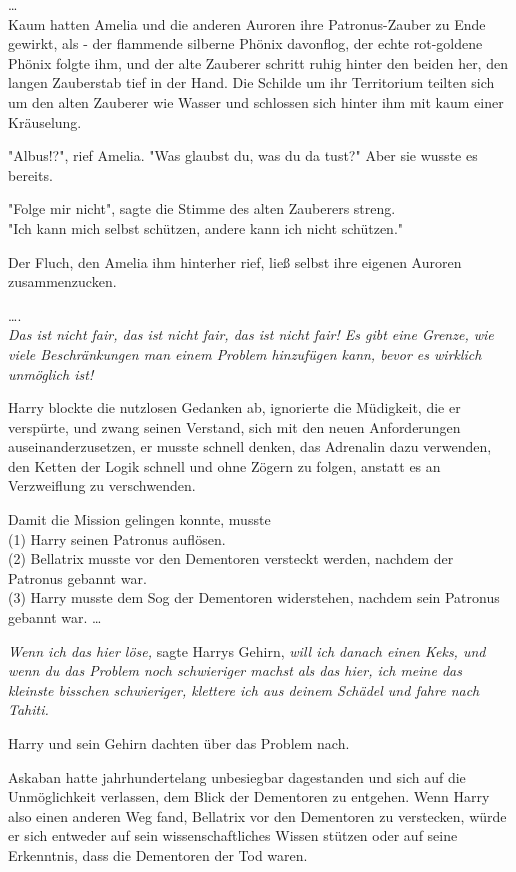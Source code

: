 {…\\ Kaum hatten Amelia und die anderen Auroren ihre Patronus-Zauber zu Ende gewirkt, als - der flammende silberne Phönix davonflog, der echte rot-goldene Phönix folgte ihm, und der alte Zauberer schritt ruhig hinter den beiden her, den langen Zauberstab tief in der Hand. Die Schilde um ihr Territorium teilten sich um den alten Zauberer wie Wasser und schlossen sich hinter ihm mit kaum einer Kräuselung.

"Albus!?", rief Amelia. "Was glaubst du, was du da tust?" Aber sie wusste es bereits.

"Folge mir nicht", sagte die Stimme des alten Zauberers streng.\\ "Ich kann mich selbst schützen, andere kann ich nicht schützen."

Der Fluch, den Amelia ihm hinterher rief, ließ selbst ihre eigenen Auroren zusammenzucken.

….\\ \emph{Das ist nicht fair, das ist nicht fair, das ist nicht fair! Es gibt eine Grenze, wie viele Beschränkungen man einem Problem hinzufügen kann, bevor es wirklich unmöglich ist!}

Harry blockte die nutzlosen Gedanken ab, ignorierte die Müdigkeit, die er verspürte, und zwang seinen Verstand, sich mit den neuen Anforderungen auseinanderzusetzen, er musste schnell denken, das Adrenalin dazu verwenden, den Ketten der Logik schnell und ohne Zögern zu folgen, anstatt es an Verzweiflung zu verschwenden.

Damit die Mission gelingen konnte, musste\\ (1) Harry seinen Patronus auflösen.\\ (2) Bellatrix musste vor den Dementoren versteckt werden, nachdem der Patronus gebannt war.\\ (3) Harry musste dem Sog der Dementoren widerstehen, nachdem sein Patronus gebannt war. …

\emph{Wenn ich das hier löse,} sagte Harrys Gehirn, \emph{will ich danach einen Keks, und wenn du das Problem noch schwieriger machst als das hier, ich meine das kleinste bisschen schwieriger, klettere ich aus deinem Schädel und fahre nach Tahiti.}

Harry und sein Gehirn dachten über das Problem nach.

Askaban hatte jahrhundertelang unbesiegbar dagestanden und sich auf die Unmöglichkeit verlassen, dem Blick der Dementoren zu entgehen. Wenn Harry also einen anderen Weg fand, Bellatrix vor den Dementoren zu verstecken, würde er sich entweder auf sein wissenschaftliches Wissen stützen oder auf seine Erkenntnis, dass die Dementoren der Tod waren.

}
